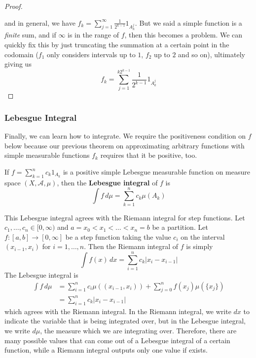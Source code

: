 \documentclass{article}
\begin{document}
\begin{proof}
\begin{center}
        \end{center}
        and in general, we have $f_k = \sum_{j=1}^\infty \frac{1}{2^{k-1}} 1_{A^j_k}$. But we said a simple function is a \textit{finite} sum, and if $\infty$ is in the range of $f$, then this becomes a problem. We can quickly fix this by just truncating the summation at a certain point in the codomain ($f_1$ only considers intervals up to $1$, $f_2$ up to $2$ and so on), ultimately giving us 
        \begin{equation}
          f_k = \sum_{j=1}^{k 2^{k-1}} \frac{1}{2^{k-1}} 1_{A^j_k}
        \end{equation}
      \end{proof}

    \subsubsection{Lebesgue Integral}

      Finally, we can learn how to integrate. We require the positiveness condition on $f$ below because our previous theorem on approximating arbitrary functions with simple measurable functions $f_k$ requires that it be positive, too. 

      \begin{definition}
        If $f = \sum_{k=1}^n c_k 1_{A_k}$ is a positive simple Lebesgue measurable function on measure space $(X, \mathcal{A}, \mu)$, then the \textbf{Lebesgue integral} of $f$ is 
        \begin{equation}
          \int f \, d\mu = \sum_{k=1}^n c_k \mu(A_k)
        \end{equation}
      \end{definition}

      This Lebesgue integral agrees with the Riemann integral for step functions. Let $c_1, \ldots, c_n \in [0, \infty)$ and $a = x_0 < x_1 < \ldots < x_n = b$ be a partition. Let $f: [a, b] \longrightarrow [0, \infty]$ be a step function taking the value $c_i$ on the interval $(x_{i-1}, x_i)$ for $i = 1, \ldots, n$. Then the Riemann integral of $f$ is simply 
      \begin{equation}
        \int f(x) \,dx = \sum_{i=1}^n c_k |x_i - x_{i-1}|
      \end{equation}
      The Lebesgue integral is 
      \begin{align*}
        \int f \, d \mu & = \sum_{i=1}^n c_i \mu((x_{i-1}, x_i)) + \sum_{j=0}^n f(x_j) \mu(\{x_j\}) \\
        & = \sum_{i=1}^n c_k |x_i - x_{i-1}|
      \end{align*}
      which agrees with the Riemann integral. In the Riemann integral, we write $dx$ to indicate the variable that is being integrated over, but in the Lebesgue integral, we write $d \mu$, the measure which we are integrating over. Therefore, there are many possible values that can come out of a Lebesgue integral of a certain function, while a Riemann integral outputs only one value if exists. 
\end{document}
